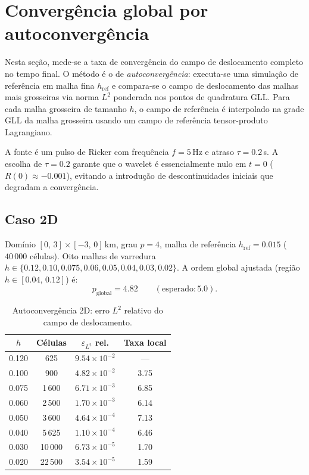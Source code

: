 \documentclass[11pt,a4paper]{article}
\begin{document}
\section{Converg\^encia global por autoconverg\^encia}
\label{sec:global-selfconv}

Nesta se\c{c}\~ao, mede-se a taxa de converg\^encia do campo de deslocamento
completo no tempo final. O m\'etodo \'e o de \emph{autoconverg\^encia}:
executa-se uma simula\c{c}\~ao de refer\^encia em malha fina $h_{\text{ref}}$
e compara-se o campo de deslocamento das malhas mais grosseiras via norma
$L^2$ ponderada nos pontos de quadratura GLL. Para cada malha grosseira de
tamanho $h$, o campo de refer\^encia \'e interpolado na grade GLL da malha
grosseira usando um campo de refer\^encia tensor-produto Lagrangiano.

A fonte \'e um pulso de Ricker com frequ\^encia $f=5$\,Hz e atraso
$\tau=0.2$\,s. A escolha de $\tau=0.2$ garante que o wavelet \'e
essencialmente nulo em $t=0$ ($R(0)\approx -0.001$), evitando a
introdu\c{c}\~ao de descontinuidades iniciais que degradam a converg\^encia.

\subsection{Caso 2D}
\label{sec:global-2d}

Dom\'inio $[0,\,3]\times[-3,\,0]$\,km, grau $p=4$, malha de refer\^encia
$h_{\text{ref}}=0.015$ ($40\,000$ c\'elulas). Oito malhas de varredura
$h\in\{0.12, 0.10, 0.075, 0.06, 0.05, 0.04, 0.03, 0.02\}$. A ordem global
ajustada (regi\~ao $h\in[0.04,\,0.12]$) \'e:
\[
    p_{\text{global}} = 4.82 \qquad (\text{esperado}: 5.0).
\]

\begin{table}[h!]
\centering
\caption{Autoconverg\^encia 2D: erro $L^2$ relativo do campo de deslocamento.}
\label{tab:global-2d}
\begin{tabular}{@{}cccc@{}}
\toprule
$h$ & C\'elulas & $\varepsilon_{L^2}$ rel. & Taxa local \\
\midrule
0.120 &    625 & $9.54\times10^{-2}$ & --- \\
0.100 &    900 & $4.82\times10^{-2}$ & 3.75 \\
0.075 &  1\,600 & $6.71\times10^{-3}$ & 6.85 \\
0.060 &  2\,500 & $1.70\times10^{-3}$ & 6.14 \\
0.050 &  3\,600 & $4.64\times10^{-4}$ & 7.13 \\
0.040 &  5\,625 & $1.10\times10^{-4}$ & 6.46 \\
0.030 & 10\,000 & $6.73\times10^{-5}$ & 1.70 \\
0.020 & 22\,500 & $3.54\times10^{-5}$ & 1.59 \\
\bottomrule
\end{tabular}
\end{table}
\end{document}
